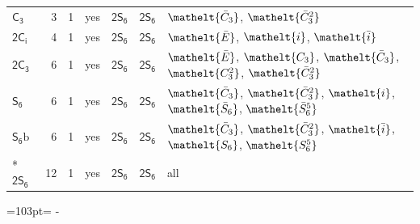 \documentclass[10pt,a4paper]{article}
\newcommand{\needspace}[1]{\par\penalty-100\begingroup\dimen0=#1\relax\dimen2=\pagegoal
  \advance\dimen2-\pagetotal\ifdim\dimen0>\dimen2\relax\ifdim\dimen2>0pt\vfil\break\fi\fi
  \endgroup}
\numberwithin{equation}{section}
\newcommand{\eltfont}[1]{{\let\sigma\eltsigma\mathelt{#1}}}
\newcommand{\grp}[1]{\mathsf{#1}}
\newcommand{\cls}[1]{\eltfont{#1}}
\newcommand{\barred}[1]{\bar{#1}}
\newcommand{\secondclass}{\mathrm{b}}
\newlength{\fillwidth}\newlength{\cellwidth}\newlength{\colwidth}
\begin{document}
{\begin{longtable}{@{}lrrlll>{\RaggedRight\arraybackslash}p{\fillwidth}@{}}
\href{C3.pdf}{$\grp{C_{3}}$} & 3 & 1 & yes & \href{2S6.pdf}{$\grp{2S_{6}}$} & \href{2S6.pdf}{$\grp{2S_{6}}$} & $\cls{\barred{C}_{3}}$, $\cls{\barred{C}_{3}^{2}}$\\
\href{2S2.pdf}{$\grp{2C_{i}}$} & 4 & 1 & yes & \href{2S6.pdf}{$\grp{2S_{6}}$} & \href{2S6.pdf}{$\grp{2S_{6}}$} & $\cls{\barred{E}}$, $\cls{i}$, $\cls{\barred{i}}$\\
\href{2C3.pdf}{$\grp{2C_{3}}$} & 6 & 1 & yes & \href{2S6.pdf}{$\grp{2S_{6}}$} & \href{2S6.pdf}{$\grp{2S_{6}}$} & $\cls{\barred{E}}$, $\cls{C_{3}}$, $\cls{\barred{C}_{3}}$, $\cls{C_{3}^{2}}$, $\cls{\barred{C}_{3}^{2}}$\\
\href{S6.pdf}{$\grp{S_{6}}$} & 6 & 1 & yes & \href{2S6.pdf}{$\grp{2S_{6}}$} & \href{2S6.pdf}{$\grp{2S_{6}}$} & $\cls{\barred{C}_{3}}$, $\cls{\barred{C}_{3}^{2}}$, $\cls{i}$, $\cls{\barred{S}_{6}}$, $\cls{\barred{S}_{6}^{5}}$\\
\href{S6b.pdf}{$\grp{S_{6}}\secondclass$} & 6 & 1 & yes & \href{2S6.pdf}{$\grp{2S_{6}}$} & \href{2S6.pdf}{$\grp{2S_{6}}$} & $\cls{\barred{C}_{3}}$, $\cls{\barred{C}_{3}^{2}}$, $\cls{\barred{i}}$, $\cls{S_{6}}$, $\cls{S_{6}^{5}}$\\*
\href{2S6.pdf}{$\grp{2S_{6}}$} & 12 & 1 & yes & \href{2S6.pdf}{$\grp{2S_{6}}$} & \href{2S6.pdf}{$\grp{2S_{6}}$} & all\\
\bottomrule\end{longtable}}
\needspace{103pt}
\end{document}
